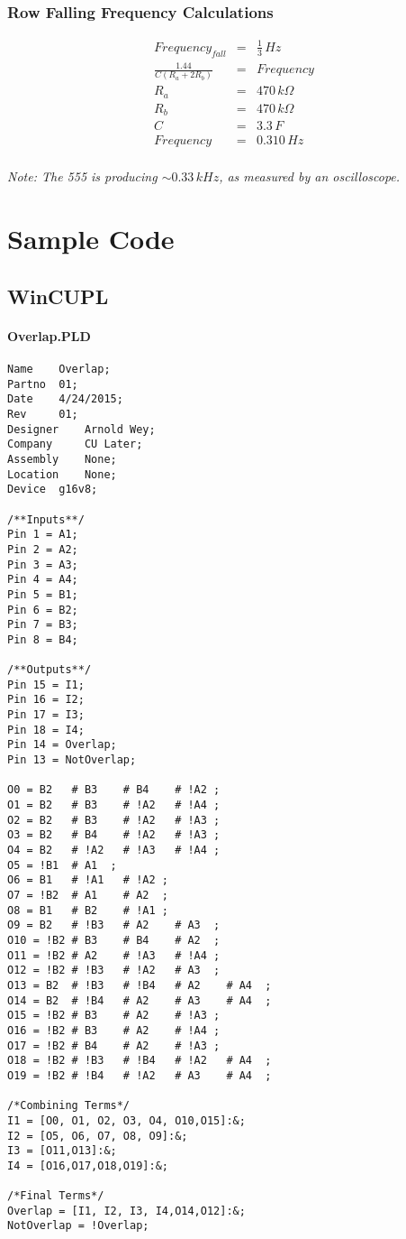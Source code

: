 \documentclass[letterpaper,titlepage,oneside]{article}
\begin{document}
\subsubsection*{Row Falling Frequency Calculations}
\begin{align*}
Frequency_{fall} &=& \frac{1}{3} \, Hz\\
\frac{1.44}{C(R_{a} + 2 R_{b})} &=& Frequency \\
R_{a} &=& 470\,k\Omega\\ 
R_{b} &=& 470\,k \Omega\\
C &=& 3.3\, F\\
Frequency &=& 0.310\,Hz\\
\end{align*}
\begin{center}
\begin{small}
\textit{Note: The 555 is producing $ \sim 0.33\,kHz$, as measured by an oscilloscope.}
\end{small}
\end{center}

\clearpage
\section{Sample Code}
\subsection{WinCUPL}
\paragraph*{Overlap.PLD\\}
\label{code:Overlap}
\begin{lstlisting}
Name 	Overlap;
Partno 	01;
Date 	4/24/2015;
Rev 	01;
Designer 	Arnold Wey;
Company 	CU Later;
Assembly 	None;
Location 	None;
Device 	g16v8;

/**Inputs**/
Pin 1 = A1;
Pin 2 = A2;
Pin 3 = A3;
Pin 4 = A4;
Pin 5 = B1;
Pin 6 = B2;
Pin 7 = B3;
Pin 8 = B4;

/**Outputs**/
Pin 15 = I1;
Pin 16 = I2;
Pin 17 = I3;
Pin 18 = I4;
Pin 14 = Overlap;
Pin 13 = NotOverlap;

O0 = B2   # B3    # B4    # !A2 ;
O1 = B2   # B3    # !A2   # !A4 ;
O2 = B2   # B3    # !A2   # !A3 ;
O3 = B2   # B4    # !A2   # !A3 ;
O4 = B2   # !A2   # !A3   # !A4 ;
O5 = !B1  # A1  ;
O6 = B1   # !A1   # !A2 ;
O7 = !B2  # A1    # A2  ;
O8 = B1   # B2    # !A1 ;
O9 = B2   # !B3   # A2    # A3  ;
O10 = !B2 # B3    # B4    # A2  ;
O11 = !B2 # A2    # !A3   # !A4 ;
O12 = !B2 # !B3   # !A2   # A3  ;
O13 = B2  # !B3   # !B4   # A2    # A4  ;
O14 = B2  # !B4   # A2    # A3    # A4  ;
O15 = !B2 # B3    # A2    # !A3 ;
O16 = !B2 # B3    # A2    # !A4 ;
O17 = !B2 # B4    # A2    # !A3 ;
O18 = !B2 # !B3   # !B4   # !A2   # A4  ;
O19 = !B2 # !B4   # !A2   # A3    # A4  ;

/*Combining Terms*/
I1 = [O0, O1, O2, O3, O4, O10,O15]:&;
I2 = [O5, O6, O7, O8, O9]:&;
I3 = [O11,O13]:&;
I4 = [O16,O17,O18,O19]:&;

/*Final Terms*/
Overlap = [I1, I2, I3, I4,O14,O12]:&;
NotOverlap = !Overlap;



\end{lstlisting}
\end{document}
